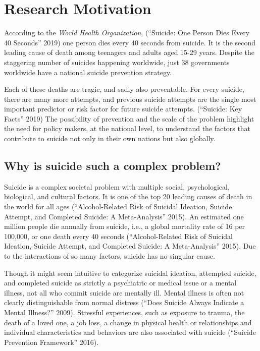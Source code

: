 \documentclass[]{article}
\begin{document}
\section{Research Motivation}\label{research-motivation}

According to the \emph{World Health Organization}, (``Suicide: One
Person Dies Every 40 Seconds'' 2019) one person dies every 40 seconds
from suicide. It is the second leading cause of death among teenagers
and adults aged 15-29 years. Despite the staggering number of suicides
happening worldwide, just 38 governments worldwide have a national
suicide prevention strategy.

Each of these deaths are tragic, and sadly also preventable. For every
suicide, there are many more attempts, and previous suicide attempts are
the single most important predictor or risk factor for future suicide
attempts. (``Suicide: Key Facts'' 2019) The possibility of prevention
and the scale of the problem highlight the need for policy makers, at
the national level, to understand the factors that contribute to suicide
not only in their own nations but also globally.

\subsection{Why is suicide such a complex
problem?}\label{why-is-suicide-such-a-complex-problem}

Suicide is a complex societal problem with multiple social,
psychological, biological, and cultural factors. It is one of the top 20
leading causes of death in the world for all ages (``Alcohol-Related
Risk of Suicidal Ideation, Suicide Attempt, and Completed Suicide: A
Meta-Analysis'' 2015). An estimated one million people die annually from
suicide, i.e., a global mortality rate of 16 per 100,000, or one death
every 40 seconds (``Alcohol-Related Risk of Suicidal Ideation, Suicide
Attempt, and Completed Suicide: A Meta-Analysis'' 2015). Due to the
interactions of so many factors, suicide has no singular cause.

Though it might seem intuitive to categorize suicidal ideation,
attempted suicide, and completed suicide as strictly a psychiatric or
medical issue or a mental illness, not all who commit suicide are
mentally ill. Mental illness is often not clearly distinguishable from
normal distress (``Does Suicide Always Indicate a Mental Illness?''
2009). Stressful experiences, such as exposure to trauma, the death of a
loved one, a job loss, a change in physical health or relationships and
individual characteristics and behaviors are also associated with
suicide (``Suicide Prevention Framework'' 2016).
\end{document}
